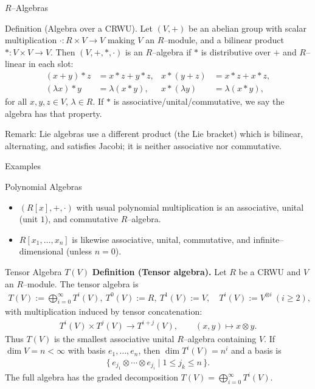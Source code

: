 \begin{frame}{$R$–Algebras}
\vspace{-0.3cm}
\begin{block}{Definition (Algebra over a CRWU).}
Let $(V,+)$ be an abelian group with scalar multiplication $\cdot : R\times V\to V$ making $V$ an $R$–module, and a bilinear product $* : V\times V\to V$.
Then $(V,+,*,\cdot)$ is an $R$–algebra if $*$ is distributive over $+$ and $R$–linear in each slot:
\vspace{-0.3cm}
\begin{align*}
(x+y)*z &= x*z + y*z, & x*(y+z) &= x*z + x*z,\\
(\lambda x)*y &= \lambda (x*y), & x*(\lambda y) &= \lambda (x*y),
\end{align*}
for all $x,y,z\in V$, $\lambda\in R$. If $*$ is associative/unital/commutative, we say the algebra has that property.
\end{block}
\vspace{-0.3cm}
\begin{block}{Remark:} Lie algebras use a different product (the Lie bracket) which is bilinear, alternating, and satisfies Jacobi; it is neither associative nor commutative.
\end{block}
\end{frame}

\begin{frame}{Examples}
\begin{block}{Polynomial Algebras}
\begin{itemize}
\item $(R[x],+,\cdot)$ with usual polynomial multiplication is an associative, unital (unit $1$), and commutative $R$–algebra.
\item $R[x_1,\dots,x_n]$ is likewise associative, unital, commutative, and infinite–dimensional (unless $n=0$).
\end{itemize}
\end{block}
\end{frame}

\begin{frame}{Tensor Algebra $T(V)$}
\textbf{Definition (Tensor algebra).}
Let $R$ be a CRWU and $V$ an $R$–module. The tensor algebra is
\begin{align*}
T(V):=\bigoplus_{i=0}^\infty T^i(V), \ T^0(V):=R,\ T^1(V):=V,\quad T^i(V):=V^{\otimes i}\ (i\ge 2),
\end{align*}
with multiplication induced by tensor concatenation:
\begin{align*}
T^i(V)\times T^j(V)\to T^{i+j}(V),\qquad (x,y)\mapsto x\otimes y.
\end{align*}
Thus $T(V)$ is the smallest associative unital $R$–algebra containing $V$.
If $\dim V = n < \infty$ with basis $e_1,\dots,e_n$, then $\dim T^i(V)=n^i$ and a basis is
\begin{align*}
\{\, e_{j_1}\otimes \cdots \otimes e_{j_i} \mid 1\le j_k\le n \,\}.
\end{align*}
The full algebra has the graded decomposition $T(V)=\bigoplus_{i=0}^\infty T^i(V)$.
\end{frame}

